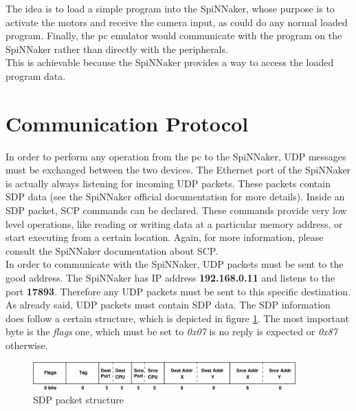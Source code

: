 \documentclass{article}
\begin{document}
The idea is to load a simple program into the SpiNNaker, whose purpose is to activate the motors and receive the camera input, as could do any normal loaded program. Finally, the pc emulator would communicate with the program on the SpiNNaker rather than directly with the peripherals. \\
This is achievable because the SpiNNaker provides a way to access the loaded program data.

\section{Communication Protocol}
In order to perform any operation from the pc to the SpiNNaker, UDP messages must be exchanged between the two devices. The Ethernet port of the SpiNNaker is actually always listening for incoming UDP packets. These packets contain SDP data (see the SpiNNaker official documentation for more details). Inside an SDP packet, SCP commands can be declared. These commands provide very low level operations, like reading or writing data at a particular memory address, or start executing from a certain location. Again, for more information, please consult the SpiNNaker documentation about SCP.\\

In order to communicate with the SpiNNaker, UDP packets must be sent to the good address. The SpiNNaker has IP address \textbf{192.168.0.11} and listens to the port \textbf{17893}. Therefore any UDP packets must be sent to this specific destination.\\

As already said, UDP packets must contain SDP data. The SDP information does follow a certain structure, which is depicted in figure \ref{fig:sdp}. The most important byte is the \textit{flags} one, which must be set to \textit{0x07} is no reply is expected or \textit{0x87} otherwise.
\begin{figure}[h]
\begin{center}
\includegraphics[width=0.9\textwidth]{sdp}
\caption{SDP packet structure}
\label{fig:sdp}
\end{center}
\end{figure}
\end{document}
